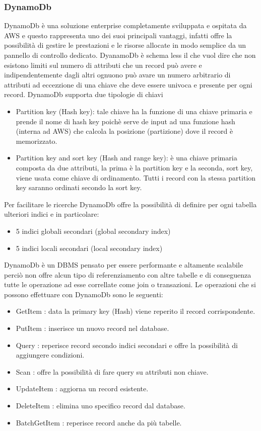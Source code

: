 \subsubsection*{DynamoDb}
DynamoDb è una soluzione enterprise completamente sviluppata e ospitata da AWS e questo rappresenta uno dei suoi principali vantaggi, infatti offre la possibilità di gestire le prestazioni e le risorse allocate in modo semplice da un pannello di controllo dedicato. DyanamoDb è schema less il che vuol dire che non esistono limiti sul numero di attributi che un record può avere e indipendentemente dagli altri ognuono può avare un numero arbitrario di attributi ad eccezzione di una chiave che deve essere univoca e presente per ogni record. DynamoDb supporta due tipologie di chiavi
\begin{itemize}
	\item Partition key (Hash key): tale chiave ha la funzione di una chiave primaria e prende il nome di hash key poichè serve de input ad una funzione hash (interna ad AWS) che calcola la posizione (partizione) dove il record è memorizzato.

	\item Partition key and sort key (Hash and range key): è una chiave primaria composta da due attributi, la prima è la partition key e la seconda, sort key, viene usata come chiave di ordinamento. Tutti i record con la stessa partition key saranno ordinati secondo la sort key. 
\end{itemize}
 Per facilitare le ricerche DynamoDb offre la possibilità di definire per ogni tabella ulteriori indici e in particolare:

\begin{itemize}
	\item 5 indici globali secondari (global secondary index)
	\item 5 indici locali secondari (local secondary index)
\end{itemize}
DynamoDb è un DBMS pensato per essere performante e altamente scalabile perciò non offre alcun tipo di referenziamento con altre tabelle e di conseguenza tutte le operazione ad esse correllate come join o transazioni.
Le operazioni che si possono effettuare con DynamoDb sono le seguenti:
\begin{itemize}
	\item GetItem : data la primary key (Hash) viene reperito il record corrispondente.
	\item PutItem : inserisce un nuovo record nel database.
	\item Query : reperisce record secondo indici secondari e offre la possibilità di aggiungere condizioni.
	\item Scan : offre la possibilità di fare query su attributi non chiave.
	\item UpdateItem : aggiorna un record esistente.
	\item DeleteItem : elimina uno specifico record dal database.
	\item BatchGetItem : reperisce record anche da più tabelle.
\end{itemize}  

